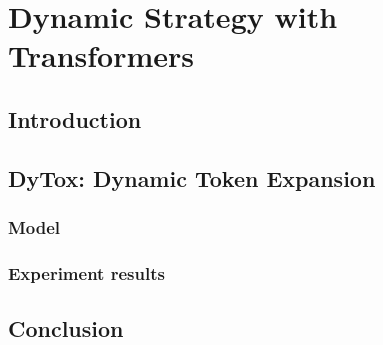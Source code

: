 \chapter{Dynamic Strategy with Transformers}
\label{chapter:dynamic}

{}


\section{Introduction}

\section{DyTox: Dynamic Token Expansion}

\subsection{Model}

\subsection{Experiment results}


\section{Conclusion}


